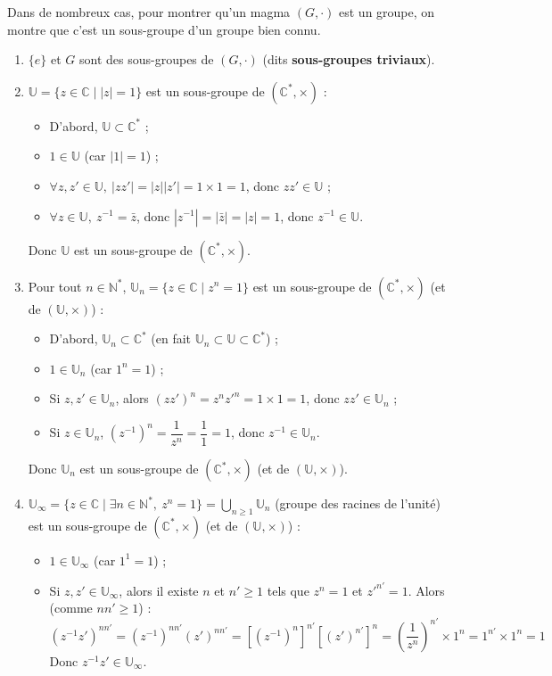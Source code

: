 \documentclass[a4paper,11pt]{article}
\newcommand{\C}{\mathbb{C}}
\newcommand{\N}{\mathbb{N}}
\newcommand{\U}{\mathbb{U}}
\newcommand{\mot}[1]{\textcolor{bordeaux}{\textbf{#1}}}
\begin{document}
\begin{remarque}
Dans de nombreux cas, pour montrer qu'un magma $(G, \cdot)$ est un groupe, on montre que c'est un sous-groupe d'un groupe bien connu.
\end{remarque}

\begin{exemples}
\begin{enumerate}
    \item $\{e\}$ et $G$ sont des sous-groupes de $(G, \cdot)$ (dits \mot{sous-groupes triviaux}).
    
    \item $\U = \{ z \in \C \mid |z| = 1 \}$ est un sous-groupe de $(\C^*, \times)$ :
    \begin{itemize}
        \item D'abord, $\U \subset \C^*$ ;
        \item $1 \in \U$ (car $|1| = 1$) ;
        \item $\forall z, z' \in \U, \ |zz'| = |z||z'| = 1 \times 1 = 1$, donc $zz' \in \U$ ;
        \item $\forall z \in \U, \ z^{-1} = \bar{z}$, donc $|z^{-1}| = |\bar{z}| = |z| = 1$, donc $z^{-1} \in \U$.
    \end{itemize}
    Donc $\U$ est un sous-groupe de $(\C^*, \times)$.
    
    \item Pour tout $n \in \N^*$, $\U_n = \{ z \in \C \mid z^n = 1 \}$ est un sous-groupe de $(\C^*, \times)$ (et de $(\U, \times)$) :
    \begin{itemize}
        \item D'abord, $\U_n \subset \C^*$ (en fait $\U_n \subset \U \subset \C^*$) ;
        \item $1 \in \U_n$ (car $1^n = 1$) ;
        \item Si $z, z' \in \U_n$, alors $(zz')^n = z^n z'^n = 1 \times 1 = 1$, donc $zz' \in \U_n$ ;
        \item Si $z \in \U_n$, $(z^{-1})^n = \dfrac{1}{z^n} = \dfrac{1}{1} = 1$, donc $z^{-1} \in \U_n$.
    \end{itemize}
    Donc $\U_n$ est un sous-groupe de $(\C^*, \times)$ (et de $(\U, \times)$).
    
    \item $\U_\infty = \{ z \in \C \mid \exists n \in \N^*, \ z^n = 1 \} = \displaystyle\bigcup_{n \ge 1} \U_n$ (groupe des racines de l'unité) est un sous-groupe de $(\C^*, \times)$ (et de $(\U, \times)$) :
    \begin{itemize}
        \item $1 \in \U_\infty$ (car $1^1 = 1$) ;
        \item Si $z, z' \in \U_\infty$, alors il existe $n$ et $n' \ge 1$ tels que $z^n = 1$ et $z'^{n'} = 1$. Alors (comme $nn' \ge 1$) :
        \[
        (z^{-1} z')^{nn'} = (z^{-1})^{nn'} (z')^{nn'} = \left[ (z^{-1})^n \right]^{n'} \left[ (z')^{n'} \right]^n = \left( \frac{1}{z^n} \right)^{n'} \times 1^n = 1^{n'} \times 1^n = 1
        \]
        Donc $z^{-1} z' \in \U_\infty$.
    \end{itemize}
\end{enumerate}
\end{exemples}
\end{document}
